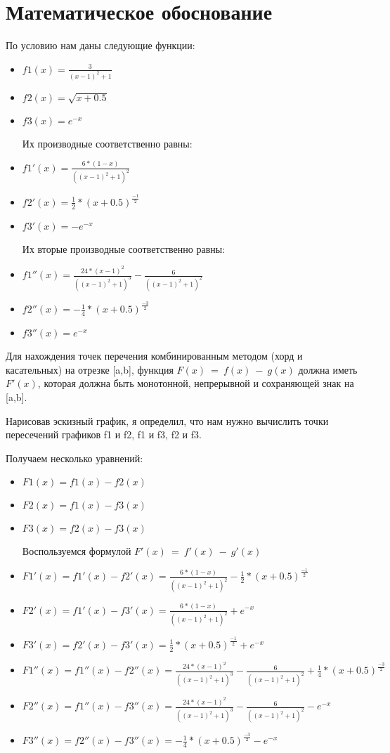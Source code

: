 \documentclass[a4paper,12pt,titlepage,finall]{article}
\begin{document}
\newpage

\section{Математическое обоснование}

По условию нам даны следующие функции:
\begin{itemize} 
\item $f1(x)=\frac{3}{(x-1)^2+1}$
\item $f2(x)=\sqrt{x+0.5}$
\item $f3(x)=e^{-x}$

Их производные соответственно равны:
\item $f1'(x)=\frac{6*(1-x)}{((x-1)^2+1)^2}$
\item $f2'(x)=\frac{1}{2}*(x+0.5)^\frac{-1}{2}$
\item $f3'(x)=-e^{-x}$

Их вторые производные соответственно равны:
\item $f1''(x)=\frac{24*(x-1)^2}{((x-1)^2+1)^3}-\frac{6}{((x-1)^2+1)^2}$
\item $f2''(x)=-\frac{1}{4}*(x+0.5)^\frac{-3}{2}$
\item $f3''(x)=e^{-x}$

\end{itemize}
Для нахождения точек перечения комбинированным методом (хорд и касательных)  на отрезке [a,b], функция $F(x)~=~f(x)~-~g(x)$ должна иметь $F'(x)$, которая должна быть монотонной, непрерывной и сохраняющей знак на [a,b].

Нарисовав эскизный график, я определил, что нам нужно вычислить точки пересечений графиков f1 и f2, f1 и f3, f2 и f3.

Получаем несколько уравнений:
\begin{itemize} 
\item $F1(x)=f1(x) - f2(x)$
\item $F2(x)=f1(x) - f3(x)$
\item $F3(x)=f2(x) - f3(x)$

Воспользуемся формулой $F'(x)~=~f'(x)~-~g'(x)$

\item $F1'(x)=f1'(x) - f2'(x) = \frac{6*(1-x)}{((x-1)^2+1)^2} -  \frac{1}{2}*(x+0.5)^\frac{-1}{2}$
\item $F2'(x)=f1'(x) - f3'(x) = \frac{6*(1-x)}{((x-1)^2+1)^2} + e^{-x}$
\item $F3'(x)=f2'(x) - f3'(x) = \frac{1}{2}*(x+0.5)^\frac{-1}{2} + e^{-x}$ 

\item $F1''(x)=f1''(x) - f2''(x) = \frac{24*(x-1)^2}{((x-1)^2+1)^3}-\frac{6}{((x-1)^2+1)^2} + \frac{1}{4}*(x+0.5)^\frac{-3}{2} $
\item $F2''(x)=f1''(x) - f3''(x) = \frac{24*(x-1)^2}{((x-1)^2+1)^3}-\frac{6}{((x-1)^2+1)^2} - e^{-x}$
\item $F3''(x)=f2''(x) - f3''(x) = - \frac{1}{4}*(x+0.5)^\frac{-3}{2} -e^{-x}$ 

\end{itemize}
\end{document}
